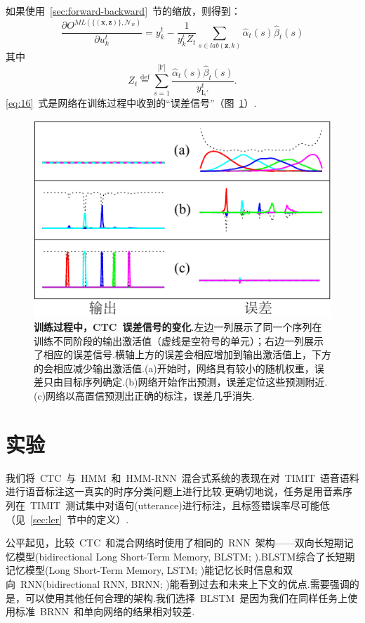 \documentclass{ctexart}
\def\cN{\mathcal{N}}
\def\vl{\mathbf{l}}
\def\vx{\mathbf{x}}
\def\vz{\mathbf{z}}
\def\defeq{\overset{\mathrm{def}}{=}}
\begin{document}
如果使用~\ref{sec:forward-backward}~节的缩放，则得到：
\begin{equation}
	\label{eq:16}
	\frac{\partial O^{\textit{ML}(\{(\vx,\vz)\},\cN_w)}}{\partial u_k^t} = 
	y_k^t - \frac{1}{y_k^tZ_t}\sum_{s\in\textit{lab}(\vz,k)}\hat{\alpha}_t(s)\hat{\beta}_t(s)
\end{equation}
其中
\[Z_t \defeq \sum_{s=1}^{|\vl'|}\frac{\hat{\alpha}_t(s)\hat{\beta}_t(s)}{y_{\vl_s'}^t}.\]
\eqref{eq:16}~式是网络在训练过程中收到的“误差信号”（图~\ref{fig:4}）.
\begin{figure}
	\label{fig:4}
	\centering
	\includegraphics[width=\columnwidth]{fig/4}
	\caption{\textbf{训练过程中，CTC~误差信号的变化}.左边一列展示了同一个序列在训练不同阶段的输出激活值（虚线是空符号的单元）；右边一列展示了相应的误差信号.横轴上方的误差会相应增加到输出激活值上，下方的会相应减少输出激活值.(a)开始时，网络具有较小的随机权重，误差只由目标序列确定.(b)网络开始作出预测，误差定位这些预测附近.(c)网络以高置信预测出正确的标注，误差几乎消失.}
\end{figure}
\section{实验}
\label{sec:experiments}
我们将~CTC~与~HMM~和~HMM-RNN~混合式系统的表现在对~TIMIT~语音语料进行语音标注这一真实的时序分类问题上进行比较.更确切地说，任务是用音素序列在~TIMIT~测试集中对语句(utterance)进行标注，且标签错误率尽可能低（见~\ref{sec:ler}~节中的定义）.

公平起见，比较~CTC~和混合网络时使用了相同的~RNN~架构——双向长短期记忆模型(bidirectional Long Short-Term Memory, BLSTM; \citealp{graves2005bidirectional}).BLSTM综合了长短期记忆模型(Long Short-Term Memory, LSTM; \citealp{hochreiter1997long})能记忆长时信息和双向~RNN(bidirectional RNN, BRNN; \citealp{schuster1997bidirectional})能看到过去和未来上下文的优点.需要强调的是，可以使用其他任何合理的架构.我们选择~BLSTM~是因为我们在同样任务上使用标准~BRNN~和单向网络的结果相对较差.
\end{document}
